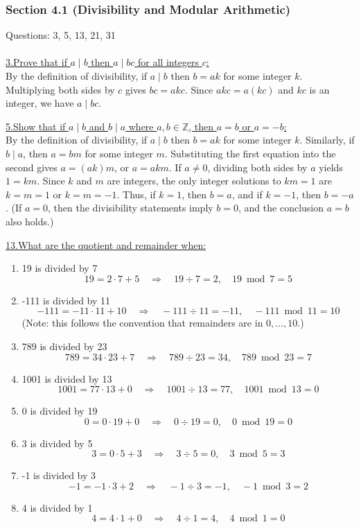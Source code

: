 \documentclass[12pt]{article}
\begin{document}
\subsubsection*{Section 4.1 (Divisibility and Modular Arithmetic)}

Questions: 3, 5, 13, 21, 31
\\\\
\underline{3.\;Prove that if $a \mid b$ then $a \mid bc$ for all integers $c$:}
\\\indent By the definition of divisibility, if $a \mid b$ then $b = ak$ for some integer $k$.
Multiplying both sides by $c$ gives $bc = akc$.
Since $akc = a(kc)$ and $kc$ is an integer, we have $a \mid bc$.   

\vspace{5mm}
\underline{5.\;Show that if $a \mid b$ and $b\mid a$ where $a,b \in \mathbb{Z}$, then $a=b$ or $a=-b$:}
\\\indent By the definition of divisibility, if $a \mid b$ then $b = ak$ for some integer $k$.
Similarly, if $b \mid a$, then $a = bm$ for some integer $m$.
Substituting the first equation into the second gives $a = (ak)m$, or $a = akm$.
If $a\neq 0$, dividing both sides by $a$ yields $1 = km$.
Since $k$ and $m$ are integers, the only integer solutions to $km=1$ are $k=m=1$ or $k=m=-1$.
Thus, if $k=1$, then $b=a$, and if $k=-1$, then $b=-a$.
(If $a=0$, then the divisibility statements imply $b=0$, and the conclusion $a=b$ also holds.)

\vspace{5mm}
\underline{13.\;What are the quotient and remainder when:}
\begin{enumerate}[label=(\alph*)]
    \item 19 is divided by 7
    \[
    19 = 2 \cdot 7 + 5 \quad \Rightarrow \quad 19 \div 7 = 2, \quad 19 \bmod 7 = 5
    \]
    \item -111 is divided by 11
    \[
    -111 = -11 \cdot 11 + 10 \quad \Rightarrow \quad -111 \div 11 = -11, \quad -111 \bmod 11 = 10
    \]
    (Note: this follows the convention that remainders are in $0,\dots,10$.)
    \item 789 is divided by 23
    \[
    789 = 34 \cdot 23 + 7 \quad \Rightarrow \quad 789 \div 23 = 34, \quad 789 \bmod 23 = 7
    \]
    \item 1001 is divided by 13
    \[
    1001 = 77 \cdot 13 + 0 \quad \Rightarrow \quad 1001 \div 13 = 77, \quad 1001 \bmod 13 = 0
    \]
    \item 0 is divided by 19
    \[
    0 = 0 \cdot 19 + 0 \quad \Rightarrow \quad 0 \div 19 = 0, \quad 0 \bmod 19 = 0
    \]
    \item 3 is divided by 5
    \[
    3 = 0 \cdot 5 + 3 \quad \Rightarrow \quad 3 \div 5 = 0, \quad 3 \bmod 5 = 3
    \]
    \item -1 is divided by 3
    \[
    -1 = -1 \cdot 3 + 2 \quad \Rightarrow \quad -1 \div 3 = -1, \quad -1 \bmod 3 = 2
    \]
    \item 4 is divided by 1
    \[
    4 = 4 \cdot 1 + 0 \quad \Rightarrow \quad 4 \div 1 = 4, \quad 4 \bmod 1 = 0
    \]
\end{enumerate}
\end{document}

